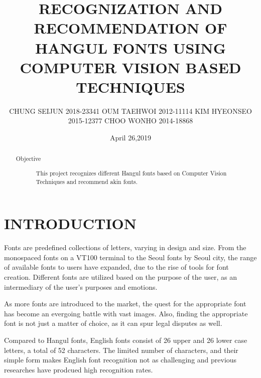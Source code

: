 \documentclass[%
 reprint,
nofootinbib,
nobibnotes,
amsmath,amssymb,
aps,
]{revtex4-1}
\begin{document}
\titlespacing*{\subsection}{0pt}{\baselineskip}{\baselineskip}

\title{RECOGNIZATION AND RECOMMENDATION OF HANGUL FONTS USING COMPUTER VISION BASED
TECHNIQUES}%

\author{CHUNG SEIJUN 2018-23341 OUM TAEHWOI 2012-11114 KIM HYEONSEO  2015-12377
CHOO WONHO 2014-18868}
%
\date{April 26,2019}

\begin{abstract}
\begin{description}
\item[Objective]
This project recognizes different Hangul fonts based on Computer Vision
    Techniques and recommend akin fonts.
\end{description}
\end{abstract}

\maketitle


\section{\label{sec:level1}INTRODUCTION}
Fonts are predefined collections of letters, varying in design and size.
From the monospaced fonts on a VT100 terminal to the
Seoul fonts by Seoul city, the range of available fonts to users have expanded, due to the rise of tools for font creation.  Different fonts are utilized based on the purpose of the user, as an
intermediary of the user's purposes and emotions.

As more fonts are introduced to the market, the quest
for the appropriate font has become an evergoing battle with vast images.
Also, finding the appropriate font is not just a matter of choice, as it can spur legal disputes as well.\cite{lawsuit}

Compared to Hangul fonts, English fonts consist of 26 upper and 26 lower case
letters, a total of 52 characters. The limited number of characters, and their
simple form makes English font recognition not as challenging and previous
researches have prodcued high recognition rates.
\end{document}
